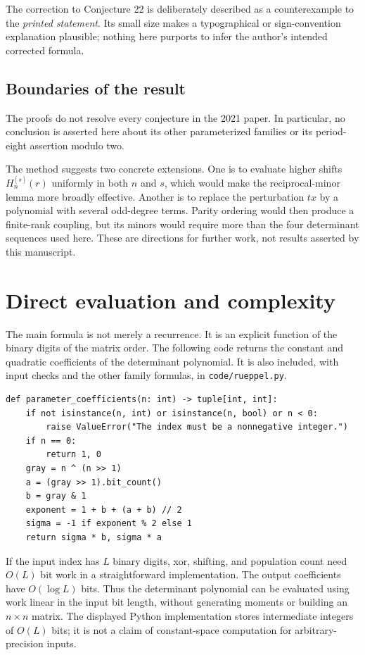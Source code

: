 \documentclass[11pt,a4paper]{article}
\numberwithin{equation}{section}
\theoremstyle{definition}
\theoremstyle{remark}
\begin{document}
The correction to Conjecture 22 is deliberately described as a
counterexample to the \emph{printed statement}. Its small size makes a
typographical or sign-convention explanation plausible; nothing here
purports to infer the author's intended corrected formula.

\subsection{Boundaries of the result}

The proofs do not resolve every conjecture in the 2021 paper.
In particular, no conclusion is asserted here about its other
parameterized families or its period-eight assertion modulo two.

The method suggests two concrete extensions. One is to evaluate higher
shifts $H_n^{[s]}(r)$ uniformly in both $n$ and $s$, which would make the
reciprocal-minor lemma more broadly effective. Another is to replace
the perturbation $tx$ by a polynomial with several odd-degree terms.
Parity ordering would then produce a finite-rank coupling, but its
minors would require more than the four determinant sequences used
here. These are directions for further work, not results asserted by
this manuscript.

\appendix
\section{Direct evaluation and complexity}\label{sec:algorithm}

The main formula is not merely a recurrence. It is an explicit function
of the binary digits of the matrix order. The following code returns
the constant and quadratic coefficients of the determinant polynomial.
It is also included, with input checks and the other family formulas,
in \texttt{code/rueppel.py}.

\begin{lstlisting}
def parameter_coefficients(n: int) -> tuple[int, int]:
    if not isinstance(n, int) or isinstance(n, bool) or n < 0:
        raise ValueError("The index must be a nonnegative integer.")
    if n == 0:
        return 1, 0
    gray = n ^ (n >> 1)
    a = (gray >> 1).bit_count()
    b = gray & 1
    exponent = 1 + b + (a + b) // 2
    sigma = -1 if exponent % 2 else 1
    return sigma * b, sigma * a
\end{lstlisting}

If the input index has $L$ binary digits, xor, shifting, and population
count need $O(L)$ bit work in a straightforward implementation.
The output coefficients have $O(\log L)$ bits. Thus the determinant
polynomial can be evaluated using work linear in the input bit length,
without generating moments or building an $n\times n$ matrix.
The displayed Python implementation stores intermediate integers of
$O(L)$ bits; it is not a claim of constant-space computation for
arbitrary-precision inputs.
\end{document}
